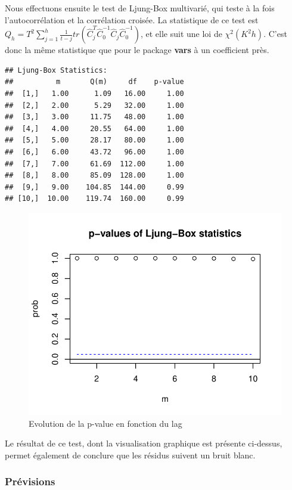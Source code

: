 \documentclass[11pt,]{article}
\begin{document}
Nous effectuons ensuite le test de Ljung-Box multivarié, qui teste à la
fois l'autocorrélation et la corrélation croisée. La statistique de ce
test est
\(Q_h = T^2 \sum_{j=1}^h \frac{1}{t-j} tr(\hat{C}_j^T \hat{C}_0^{-1} \hat{C}_j \hat{C}_0^{-1})\),
et elle suit une loi de \(\chi^2(K^2h)\). C'est donc la même statistique
que pour le package \textbf{vars} à un coefficient près.

\begin{verbatim}
## Ljung-Box Statistics:  
##          m       Q(m)     df    p-value
##  [1,]   1.00      1.09   16.00     1.00
##  [2,]   2.00      5.29   32.00     1.00
##  [3,]   3.00     11.75   48.00     1.00
##  [4,]   4.00     20.55   64.00     1.00
##  [5,]   5.00     28.17   80.00     1.00
##  [6,]   6.00     43.72   96.00     1.00
##  [7,]   7.00     61.69  112.00     1.00
##  [8,]   8.00     85.09  128.00     1.00
##  [9,]   9.00    104.85  144.00     0.99
## [10,]  10.00    119.74  160.00     0.99
\end{verbatim}

\begin{figure}[htbp]
\centering
\includegraphics{Rapport_final_files/figure-latex/unnamed-chunk-48-1.pdf}
\caption{\label{fig29} Evolution de la p-value en fonction du lag}
\end{figure}

Le résultat de ce test, dont la visualisation graphique est présente
ci-dessus, permet également de conclure que les résidus suivent un bruit
blanc.

\subsubsection{Prévisions}\label{previsions-1}
\end{document}
